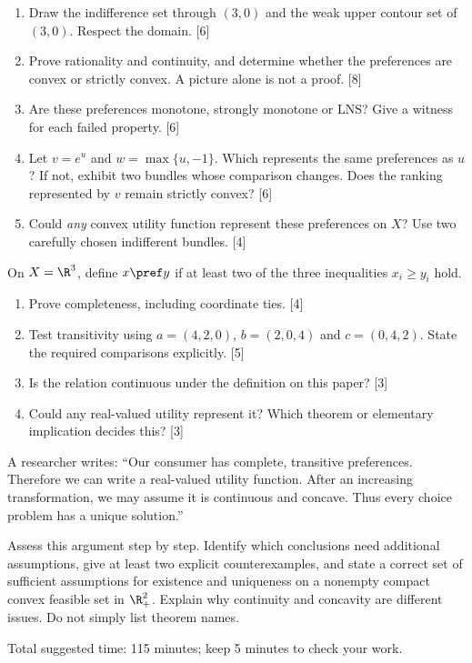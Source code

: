 \begin{enumerate}[label=(\alph*)]
\item Draw the indifference set through $(3,0)$ and the weak upper contour set of $(3,0)$. Respect the domain. \hfill [6]
\item Prove rationality and continuity, and determine whether the preferences are convex or strictly convex. A picture alone is not a proof. \hfill [8]
\item Are these preferences monotone, strongly monotone or LNS? Give a witness for each failed property. \hfill [6]
\item Let $v=e^u$ and $w=\max\{u,-1\}$. Which represents the same preferences as $u$? If not, exhibit two bundles whose comparison changes. Does the ranking represented by $v$ remain strictly convex? \hfill [6]
\item Could \emph{any} convex utility function represent these preferences on $X$? Use two carefully chosen indifferent bundles. \hfill [4]
\end{enumerate}
\clearpage
{}
On $X=\R^3$, define $x\pref y$ if at least two of the three inequalities $x_i\ge y_i$ hold.
\begin{enumerate}[label=(\alph*)]
\item Prove completeness, including coordinate ties. \hfill [4]
\item Test transitivity using $a=(4,2,0)$, $b=(2,0,4)$ and $c=(0,4,2)$. State the required comparisons explicitly. \hfill [5]
\item Is the relation continuous under the definition on this paper? \hfill [3]
\item Could any real-valued utility represent it? Which theorem or elementary implication decides this? \hfill [3]
\end{enumerate}
A researcher writes: ``Our consumer has complete, transitive preferences. Therefore we can write a real-valued utility function. After an increasing transformation, we may assume it is continuous and concave. Thus every choice problem has a unique solution.''

Assess this argument step by step. Identify which conclusions need additional assumptions, give at least two explicit counterexamples, and state a correct set of sufficient assumptions for existence and uniqueness on a nonempty compact convex feasible set in $\R_+^2$. Explain why continuity and concavity are different issues. Do not simply list theorem names.

\medskip Total suggested time: 115 minutes; keep 5 minutes to check your work.
